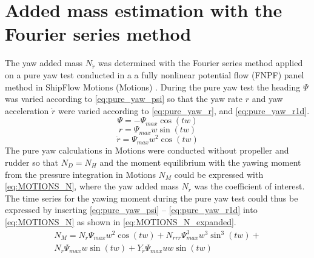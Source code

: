 \section{Added mass estimation with the Fourier series method}
\label{sec:fourier}
The yaw added mass $N_{\dot{r}}$ was determined with the Fourier series method \cite{sakamotoCFDBasedTurning2021} applied on a pure yaw test conducted in a a fully nonlinear potential flow (FNPF) panel method in ShipFlow Motions (Motions) \cite{kjellbergFullyNonlinearUnsteady2013}.
During the pure yaw test the heading $\Psi$ was varied according to \autoref{eq:pure_yaw_psi} so that the yaw rate $r$ and yaw acceleration $\dot{r}$ were varied according to \autoref{eq:pure_yaw_r}, and \autoref{eq:pure_yaw_r1d}.
\begin{equation}
    \Psi = - \Psi_{max} \cos{\left(t w \right)}
    \label{eq:pure_yaw_psi}
\end{equation}
\begin{equation}
    r = \Psi_{max} w \sin{\left(t w \right)}
    \label{eq:pure_yaw_r}
\end{equation}
\begin{equation}
    \dot{r} = \Psi_{max} w^{2} \cos{\left(t w \right)}
    \label{eq:pure_yaw_r1d}
\end{equation}
The pure yaw calculations in Motions were conducted without propeller and rudder so that $N_D=N_H$ and the moment equilibrium with the yawing moment from the pressure integration in Motions $N_M$ could be expressed with \autoref{eq:MOTIONS_N}, where the yaw added mass $N_{\dot{r}}$ was the coefficient of interest. 
\begin{equation}
    
    \label{eq:MOTIONS_N}
\end{equation}
The time series for the yawing moment during the pure yaw test could thus be expressed by inserting \autoref{eq:pure_yaw_psi} -- \autoref{eq:pure_yaw_r1d} into \autoref{eq:MOTIONS_N} as shown in \autoref{eq:MOTIONS_N_expanded}.
\begin{equation}
    \begin{align}    
    N_{M} = N_{\dot{r}} \Psi_{max} w^{2} \cos{\left(t w \right)} + N_{rrr} \Psi_{max}^{3} w^{3} \sin^{3}{\left(t w \right)} + \\ 
    N_{r} \Psi_{max} w \sin{\left(t w \right)} + Y_{\dot{r}} \Psi_{max} u w \sin{\left(t w \right)}
    \end{align}
    \label{eq:MOTIONS_N_expanded}
\end{equation}

